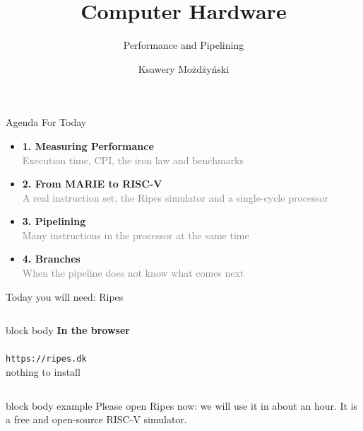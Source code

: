 \documentclass[aspectratio=169,10pt]{beamer}
\title{Computer Hardware}
\subtitle{Performance and Pipelining}
\author{Ksawery Możdżyński}
\date{}
\newcommand{\keymsg}[1]{%
  \begin{beamercolorbox}[rounded=true,sep=0.1cm,wd=\textwidth]{block body example}
    \centering\footnotesize #1
  \end{beamercolorbox}}
\begin{document}
\begin{frame}
  \titlepage
\end{frame}

\begin{frame}{Agenda For Today}
  \Large
  \begin{itemize}
    \item[\textcolor{DeepBlue}{\faTachometer*}] \textbf{1. Measuring Performance} \\
    \textcolor{gray}{\small Execution time, CPI, the iron law and benchmarks}
    \vspace{0.25cm}

    \item[\textcolor{DeepBlue}{\faExchange*}] \textbf{2. From MARIE to RISC-V} \\
    \textcolor{gray}{\small A real instruction set, the Ripes simulator and a single-cycle processor}
    \vspace{0.25cm}

    \item[\textcolor{DeepBlue}{\faStream}] \textbf{3. Pipelining} \\
    \textcolor{gray}{\small Many instructions in the processor at the same time}
    \vspace{0.25cm}

    \item[\textcolor{DeepBlue}{\faCodeBranch}] \textbf{4. Branches} \\
    \textcolor{gray}{\small When the pipeline does not know what comes next}
  \end{itemize}
\end{frame}

\begin{frame}{Today you will need: Ripes}
  \begin{columns}[c]
      \begin{beamercolorbox}[rounded=true,sep=0.16cm,wd=\linewidth]{block body}
        \centering\large\textbf{In the browser}\\[0.1cm]
        {\Huge\textcolor{DeepBlue}{\faGlobe}}\\[0.15cm]
        \normalsize\texttt{https://ripes.dk}\\[0.05cm]
        \footnotesize nothing to install
      \end{beamercolorbox}
  \end{columns}
  \vfill
  \keymsg{Please open Ripes now: we will use it in about an hour. It is a free and open-source RISC-V simulator.}
\end{frame}
\end{document}
